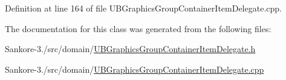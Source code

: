 Definition at line 164 of file U\-B\-Graphics\-Group\-Container\-Item\-Delegate.\-cpp.



The documentation for this class was generated from the following files\-:\begin{DoxyCompactItemize}
\item 
Sankore-\/3./src/domain/\hyperlink{_u_b_graphics_group_container_item_delegate_8h}{U\-B\-Graphics\-Group\-Container\-Item\-Delegate.\-h}\item 
Sankore-\/3./src/domain/\hyperlink{_u_b_graphics_group_container_item_delegate_8cpp}{U\-B\-Graphics\-Group\-Container\-Item\-Delegate.\-cpp}\end{DoxyCompactItemize}
